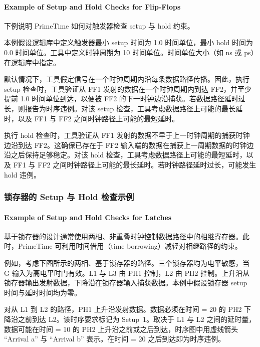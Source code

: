 \paragraph*{Example of Setup and Hold Checks for Flip-Flops}

下例说明 PrimeTime 如何对触发器检查 setup 与 hold 约束。


本例假设逻辑库中定义触发器最小 setup 时间为 1.0 时间单位，最小 hold 时间为 0.0 时间单位。工具中定义时钟周期为 10 时间单位。时间单位大小（如 ns 或 ps）在逻辑库中指定。

默认情况下，工具假定信号在一个时钟周期内沿每条数据路径传播。因此，执行 setup 检查时，工具验证从 FF1 发射的数据在一个时钟周期内到达 FF2，并至少提前 1.0 时间单位到达，以便被 FF2 的下一时钟边沿捕获。若数据路径延时过长，则报告为时序违例。对该 setup 检查，工具考虑数据路径上可能的最长延时，以及 FF1 与 FF2 之间时钟路径上可能的最短延时。

执行 hold 检查时，工具验证从 FF1 发射的数据不早于上一时钟周期的捕获时钟边沿到达 FF2。这确保已存在于 FF2 输入端的数据在捕获上一周期数据的时钟边沿之后保持足够稳定。对该 hold 检查，工具考虑数据路径上可能的最短延时，以及 FF1 与 FF2 之间时钟路径上可能的最长延时。若时钟路径延时过长，可能发生 hold 违例。

\subsubsection{锁存器的 Setup 与 Hold 检查示例}
\paragraph*{Example of Setup and Hold Checks for Latches}

基于锁存器的设计通常使用两相、非重叠时钟控制数据路径中的相继寄存器。此时，PrimeTime 可利用时间借用（time borrowing）减轻对相继路径的约束。

例如，考虑下图所示的两相、基于锁存器的路径。三个锁存器均为电平敏感，当 G 输入为高电平时门有效。L1 与 L3 由 PH1 控制，L2 由 PH2 控制。上升沿从锁存器输出发射数据，下降沿在锁存器输入捕获数据。本例中假设锁存器 setup 时间与延时时间均为零。


对从 L1 到 L2 的路径，PH1 上升沿发射数据。数据必须在时间 = 20 的 PH2 下降沿之前到达 L2。该时序要求标记为 Setup~1。取决于 L1 与 L2 之间的延时量，数据可能在时间 = 10 的 PH2 上升沿之前或之后到达，时序图中用虚线箭头 ``Arrival a'' 与 ``Arrival b'' 表示。在时间 = 20 之后到达即为时序违例。

